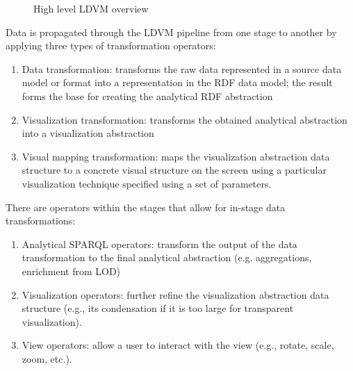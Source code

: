 \documentclass[a4paper,12pt,oneside]{report}
\begin{document}
{{{{\begin{figure}[h!]
\caption{High level LDVM overview}
\end{figure}
}
Data is propagated through the LDVM pipeline from one stage to another by applying three types of transformation operators:
\begin{enumerate}
\item{Data transformation: transforms the raw data represented in a source data model or format into a representation in the RDF data model; the result forms the base for creating the analytical RDF abstraction}
\item{Visualization transformation: transforms the obtained analytical abstraction into a visualization abstraction}
\item{Visual mapping transformation: maps the visualization abstraction data structure to a concrete visual structure on the screen using a particular visualization technique specified using a set of parameters. }
\end{enumerate}
There are operators within the stages that allow for in-stage data transformations: 
\begin{enumerate}
\item{Analytical SPARQL operators: transform the output of the data transformation to the final analytical abstraction (e.g. aggregations, enrichment from LOD)}
\item{Visualization operators: further refine the visualization abstraction data structure (e.g., its condensation if it is too large for transparent visualization).}
\item{View operators: allow a user to interact with the view (e.g., rotate, scale, zoom, etc.). }
\end{enumerate}
}
}}
\end{document}
